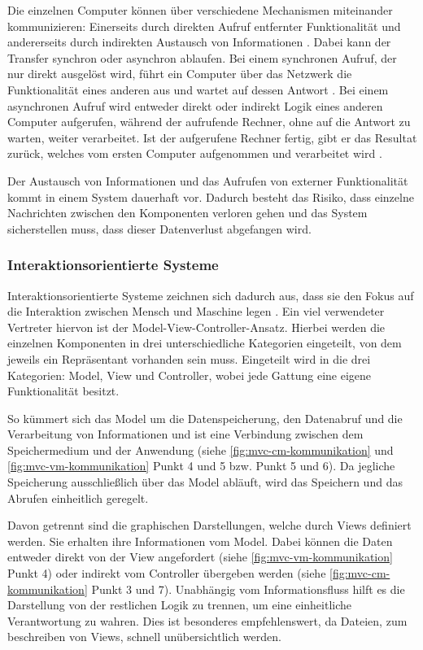 Die einzelnen Computer können über verschiedene Mechanismen miteinander kommunizieren: Einerseits durch direkten Aufruf entfernter Funktionalität und andererseits durch indirekten Austausch von Informationen \parencite[vgl.][S. 116]{starke_effektive_2015}. Dabei kann der Transfer synchron oder asynchron ablaufen. Bei einem synchronen Aufruf, der nur direkt ausgelöst wird, führt ein Computer über das Netzwerk die Funktionalität eines anderen aus und wartet auf dessen Antwort \parencite{synchrone_2018}.
Bei einem asynchronen Aufruf wird entweder direkt oder indirekt Logik eines anderen Computer aufgerufen, während der aufrufende Rechner, ohne auf die Antwort zu warten, weiter verarbeitet. Ist der aufgerufene Rechner fertig, gibt er das Resultat zurück, welches vom ersten Computer aufgenommen und verarbeitet wird \parencite{wiki_asynchrone_2019}.

Der Austausch von Informationen und das Aufrufen von externer Funktionalität kommt in einem System dauerhaft vor. Dadurch besteht das Risiko, dass einzelne Nachrichten zwischen den Komponenten verloren gehen und das System sicherstellen muss, dass dieser Datenverlust abgefangen wird.

\subsubsection{Interaktionsorientierte Systeme}
\label{sec:mvc}

Interaktionsorientierte Systeme zeichnen sich dadurch aus, dass sie den Fokus auf die Interaktion zwischen Mensch und Maschine legen \parencite[vgl.][S. 124]{starke_effektive_2015}.
Ein viel verwendeter Vertreter hiervon ist der Model-View-Controller-Ansatz. Hierbei werden die einzelnen Komponenten in drei unterschiedliche Kategorien eingeteilt, von dem jeweils ein Repräsentant vorhanden sein muss. Eingeteilt wird in die drei Kategorien: Model, View und Controller, wobei jede Gattung eine eigene Funktionalität besitzt.

So kümmert sich das Model um die Datenspeicherung, den Datenabruf und die Verarbeitung von Informationen und ist eine Verbindung zwischen dem Speichermedium und der Anwendung (siehe \cref{fig:mvc-cm-kommunikation} und \cref{fig:mvc-vm-kommunikation} Punkt 4 und 5 bzw. Punkt 5 und 6). Da jegliche Speicherung ausschließlich über das Model abläuft, wird das Speichern und das Abrufen einheitlich geregelt.

Davon getrennt sind die graphischen Darstellungen, welche durch Views definiert werden. Sie erhalten ihre Informationen vom Model. Dabei können die Daten entweder direkt von der View angefordert (siehe \cref{fig:mvc-vm-kommunikation} Punkt 4) oder indirekt vom Controller übergeben werden (siehe \cref{fig:mvc-cm-kommunikation} Punkt 3 und 7). Unabhängig vom Informationsfluss hilft es die Darstellung von der restlichen Logik zu trennen, um eine einheitliche Verantwortung zu wahren. Dies ist besonderes empfehlenswert, da Dateien, zum beschreiben von Views, schnell unübersichtlich werden.

